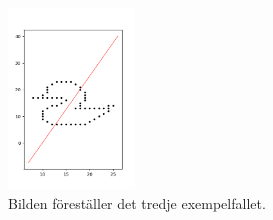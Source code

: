 \begin{centering}
  \begin{figure}[h]
      \centering
      \includegraphics[width=0.3\textwidth]{sample3.png}
      \caption{Bilden föreställer det tredje exempelfallet.}
      \label{fig:enter-label}
  \end{figure}
\end{centering}